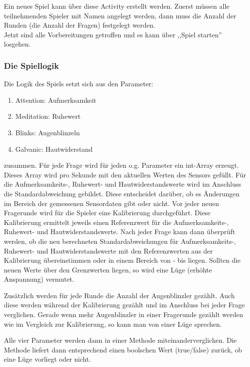 	Ein neues Spiel kann über diese Activity erstellt werden.
	Zuerst müssen alle teilnehmenden Spieler mit Namen angelegt werden, dann muss die Anzahl der Runden (die Anzahl der Fragen) festgelegt werden.\\
	Jetzt sind alle Vorbereitungen getroffen und es kann über ,,Spiel starten'' losgehen.
	
	\subsubsection*{Die Spiellogik}
	
	Die Logik des Spiels setzt sich aus den Parameter:
	\begin{enumerate}
	\item Attention: Aufmerksamkeit
	\item Meditation: Ruhewert
	\item Blinks: Augenblinzeln
	\item Galvanic: Hautwiderstand
	\end{enumerate}
	
zusammen.
Für jede Frage wird für jeden o.g. Parameter ein int-Array erzeugt. 
Dieses Array wird pro Sekunde mit den aktuellen Werten des Sensors gefüllt. 
Für die Aufmerksamkeits-, Ruhewert- und Hautwiderstandswerte wird im Anschluss die Standardabweichung gebildet. 
Diese entscheidet darüber, ob es Änderungen im Bereich der gemessenen Sensordaten gibt oder nicht. 
Vor jeder neuen Fragerunde wird für die Spieler eine Kalibrierung durchgeführt. 
Diese Kalibrierung ermittelt jeweils einen Referenzwert für die Aufmerksamkeits-, Ruhewert- und Hautwiderstandswerte. 
Nach jeder Frage kann dann überprüft werden, ob die neu berechneten Standardabweichungen für Aufmerksamkeits-, Ruhewert- und Hautwiderstandswerte mit den Referenzwerten aus der Kalibrierung übereinstimmen oder in einem Bereich von - bis liegen. 
Sollten die neuen Werte über den Grenzwerten liegen, so wird eine Lüge (erhöhte Anspannung) vermutet.

Zusätzlich werden für jede Runde die Anzahl der Augenblinzler gezählt. 
Auch diese werden während der Kalibrierung gezählt und im Anschluss bei jeder Frage verglichen. 
Gerade wenn mehr Augenblinzler in einer Fragerunde gezählt werden wie im Vergleich zur Kalibrierung, so kann man von einer Lüge sprechen.

Alle vier Parameter werden dann in einer Methode miteinanderverglichen.
Die Methode liefert dann entsprechend einen boolschen Wert (true/false) zurück, ob eine Lüge vorliegt oder nicht.


